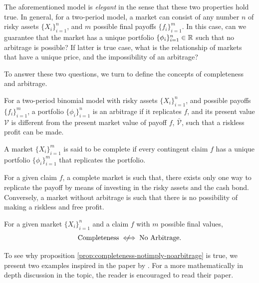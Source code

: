 \documentclass[../TGMAFFIRO.tex]{subfiles}
\begin{document}
The aforementioned model is \textit{elegant} in the sense that these two properties hold true. In general, for a two-period model, a market can consist of any number $n$ of risky assets $\{X_i\}_{i=1}^n$, and $m$ possible final payoffs $\{f_i\}_{i=1}^m$. In this case, can we guarantee that the market has a unique portfolio $\{\phi_i\}_{i=1}^{n} \in \mathbb{R}$ such that no arbitrage is possible? If latter is true case, what is the relationship of markets that have a unique price, and the impossibility of an arbitrage?

To answer these two questions, we turn to define the concepts of completeness and arbitrage.

\begin{definition}
	For a two-period binomial model with risky assets $\{X_i\}_{i=1}^n$, and possible payoffs $\{f_i\}_{i=1}^m$, a portfolio $\{\phi_i\}_{i=1}^{n}$ is an arbitrage if it replicates $f$, and its present value $\mathcal V$ is different from the present market value of payoff $f$, $\bar{\mathcal V}$, such that a riskless profit can be made.
\end{definition}

\begin{definition}
	A market $\{X_i\}_{i=1}^m$ is said to be complete if every contingent claim $f$ has a unique portfolio $\{\phi_i\}_{i=1}^m$ that replicates the portfolio.
\end{definition}

For a given claim $f$, a complete market is such that, there exists only one way to replicate the payoff by means of investing in the risky assets and the cash bond. Conversely, a market without arbitrage is such that there is no possibility of making a riskless and free profit.\\

\begin{proposition}\label{prop:completeness-notimply-noarbitrage}
	For a given market $\{X_i\}_{i=1}^n$ and a claim $f$ with $m$ possible final values, 
	\begin{equation}
		\text{Completeness} \notiff \text{No Arbitrage}.
	\end{equation}
\end{proposition}

To see why proposition \ref{prop:completeness-notimply-noarbitrage} is true, we present two examples inspired in the paper by . For a more mathematically in depth discussion in the topic, the reader is encouraged to read their paper.\\
\end{document}
